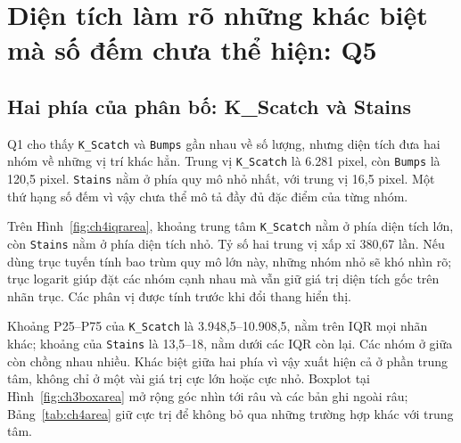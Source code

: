 \documentclass[12pt,a4paper,oneside]{report}
\newcommand{\maCot}[1]{{\urlstyle{tt}\def\UrlBreaks{\do\_\do\/\do\.}\def\UrlBigBreaks{}\nolinkurl{#1}}}
\begin{document}
\section{Diện tích làm rõ những khác biệt mà số đếm chưa thể hiện: Q5}
\label{sec:ch4q5}

\subsection{Hai phía của phân bố: K\_Scatch và Stains}

Q1 cho thấy \maCot{K_Scatch} và \maCot{Bumps} gần nhau về số lượng, nhưng diện tích đưa hai nhóm về những vị trí khác hẳn. Trung vị \maCot{K_Scatch} là 6.281 pixel, còn \maCot{Bumps} là 120,5 pixel. \maCot{Stains} nằm ở phía quy mô nhỏ nhất, với trung vị 16,5 pixel. Một thứ hạng số đếm vì vậy chưa thể mô tả đầy đủ đặc điểm của từng nhóm.

\begin{center}\begin{minipage}{\linewidth}
\centering
{}
\label{fig:ch4iqrarea}
\end{minipage}\end{center}

Trên Hình~\ref{fig:ch4iqrarea}, khoảng trung tâm \maCot{K_Scatch} nằm ở phía diện tích lớn, còn \maCot{Stains} nằm ở phía diện tích nhỏ. Tỷ số hai trung vị xấp xỉ 380,67 lần. Nếu dùng trục tuyến tính bao trùm quy mô lớn này, những nhóm nhỏ sẽ khó nhìn rõ; trục logarit giúp đặt các nhóm cạnh nhau mà vẫn giữ giá trị diện tích gốc trên nhãn trục. Các phân vị được tính trước khi đổi thang hiển thị.

Khoảng P25--P75 của \maCot{K_Scatch} là 3.948,5--10.908,5, nằm trên IQR mọi nhãn khác; khoảng của \maCot{Stains} là 13,5--18, nằm dưới các IQR còn lại. Các nhóm ở giữa còn chồng nhau nhiều. Khác biệt giữa hai phía vì vậy xuất hiện cả ở phần trung tâm, không chỉ ở một vài giá trị cực lớn hoặc cực nhỏ. Boxplot tại Hình~\ref{fig:ch3boxarea} mở rộng góc nhìn tới râu và các bản ghi ngoài râu; Bảng~\ref{tab:ch4area} giữ cực trị để không bỏ qua những trường hợp khác với trung tâm.
\end{document}
